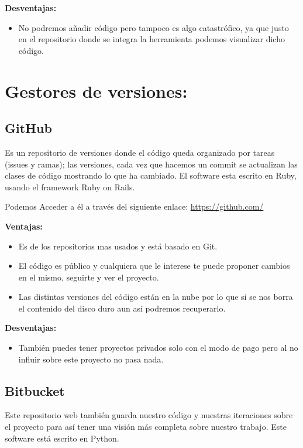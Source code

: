 \textbf{Desventajas:}

\begin{itemize}
\item No podremos añadir código pero tampoco es algo catastrófico, ya que justo en el repositorio donde se integra la herramienta podemos visualizar dicho código.

\end{itemize}

\section{Gestores de versiones:}
\subsection{GitHub}
Es un repositorio de versiones donde el código queda organizado por tareas (issues y ramas); las versiones, cada vez que hacemos un commit se actualizan las clases de código mostrando lo que ha cambiado.
El software esta escrito en Ruby, usando el framework Ruby on Rails.

Podemos Acceder a él a través del siguiente enlace: 
\url{https://github.com/}



\textbf{Ventajas:}

\begin{itemize}
\item Es de los repositorios mas usados y está basado en Git.

\item El código es público y cualquiera que le interese te puede proponer cambios en el mismo, seguirte y ver el proyecto.

\item Las distintas versiones del código están en la nube por lo que si se nos borra el contenido del disco duro aun así podremos recuperarlo.
\end{itemize}

\textbf{Desventajas:}

\begin{itemize}
\item También puedes tener proyectos privados solo con el modo de pago pero al no influir sobre este proyecto no pasa nada.
\end{itemize}


\subsection{Bitbucket}
Este repositorio web también guarda nuestro código y nuestras iteraciones sobre el proyecto para así tener una visión más completa sobre nuestro trabajo.
Este software está escrito en Python.

